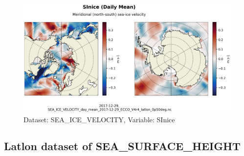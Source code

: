 \begin{figure}[H]
\centering
\includegraphics[scale=0.55]{../images/plots/latlon_plots/Sea-Ice_Velocity/SInice.png}
\caption{Dataset: SEA\_ICE\_VELOCITY, Variable: SInice}
\label{tab:table-SEA_ICE_VELOCITY_SInice-Plot}
\end{figure}
\subsection{Latlon dataset of SEA\_SURFACE\_HEIGHT}
\newp
